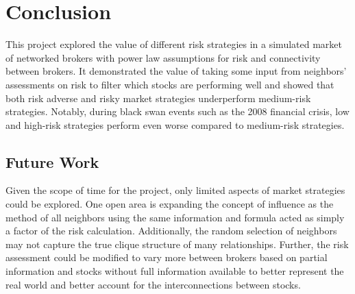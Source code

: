 \documentclass[letterpaper, 11 pt, proceedings]{IEEEtran}
\begin{document}
	
	\section{Conclusion}\label{sec:conclusion}
	This project explored the value of different risk strategies in a simulated market of networked brokers with power law assumptions for risk and connectivity between brokers. It demonstrated the value of taking some input from neighbors' assessments on risk to filter which stocks are performing well and showed that both risk adverse and risky market strategies underperform medium-risk strategies. Notably, during black swan events such as the 2008 financial crisis, low and high-risk strategies perform even worse compared to medium-risk strategies.
	
	\subsection{Future Work}\label{subsec:futurework}
	Given the scope of time for the project, only limited aspects of market strategies could be explored. One open area is expanding the concept of influence as the method of all neighbors using the same information and formula acted as simply a factor of the risk calculation. Additionally, the random selection of neighbors may not capture the true clique structure of many relationships. Further, the risk assessment could be modified to vary more between brokers based on partial information and stocks without full information available to better represent the real world and better account for the interconnections between stocks.
\end{document}

